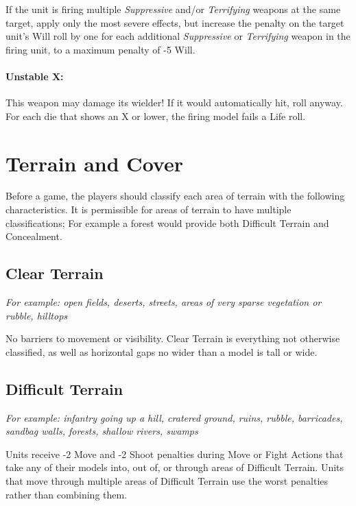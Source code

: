 \begin{multicols}{2}
If the unit is firing multiple \textit{Suppressive} and/or \textit{Terrifying} weapons at the same target, apply only the most severe effects, but increase the penalty on the target unit's Will roll by one for each additional \textit{Suppressive} or \textit{Terrifying} weapon in the firing unit, to a maximum penalty of -5 Will.

\subsubsection*{Unstable X:} This weapon may damage its wielder! If it would automatically hit, roll anyway. For each die that shows an X or lower, the firing model fails a Life roll.




\chapter{Terrain and Cover}

Before a game, the players should classify each area of terrain with the following characteristics. It is permissible for areas of terrain to have multiple classifications; For example a forest would provide both Difficult Terrain and Concealment.




\section*{Clear Terrain}
\textit{For example: open fields, deserts, streets, areas of very sparse vegetation or rubble, hilltops}

No barriers to movement or visibility. Clear Terrain is everything not otherwise classified, as well as horizontal gaps no wider than a model is tall or wide.




\section*{Difficult Terrain}
\textit{For example: infantry going up a hill, cratered ground, ruins, rubble, barricades, sandbag walls, forests, shallow rivers, swamps}

Units receive -2 Move and -2 Shoot penalties during Move or Fight Actions that take any of their models into, out of, or through areas of Difficult Terrain. Units that move through multiple areas of Difficult Terrain use the worst penalties rather than combining them.





\end{multicols}
